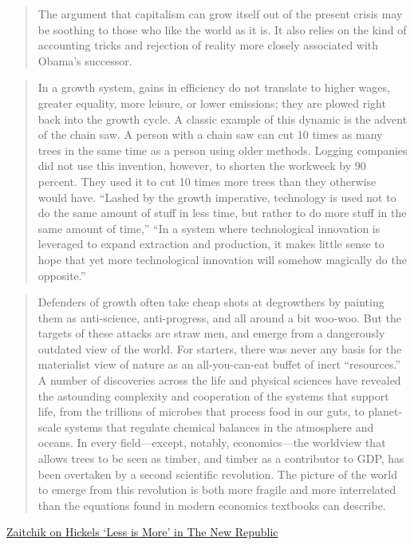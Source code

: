 \documentclass[
]{book}
\begin{document}
\begin{quote}
The argument that capitalism can grow itself out of the present crisis may be soothing to those who like the world as it is. It also relies on the kind of accounting tricks and rejection of reality more closely associated with Obama's successor.
\end{quote}

\begin{quote}
In a growth system, gains in efficiency do not translate to higher wages, greater equality, more leisure, or lower emissions; they are plowed right back into the growth cycle. A classic example of this dynamic is the advent of the chain saw. A person with a chain saw can cut 10 times as many trees in the same time as a person using older methods. Logging companies did not use this invention, however, to shorten the workweek by 90 percent. They used it to cut 10 times more trees than they otherwise would have. ``Lashed by the growth imperative, technology is used not to do the same amount of stuff in less time, but rather to do more stuff in the same amount of time,''
``In a system where technological innovation is leveraged to expand extraction and production, it makes little sense to hope that yet more technological innovation will somehow magically do the opposite.''
\end{quote}

\begin{quote}
Defenders of growth often take cheap shots at degrowthers by painting them as anti-science, anti-progress, and all around a bit woo-woo. But the targets of these attacks are straw men, and emerge from a dangerously outdated view of the world. For starters, there was never any basis for the materialist view of nature as an all-you-can-eat buffet of inert ``resources.'' A number of discoveries across the life and physical sciences have revealed the astounding complexity and cooperation of the systems that support life, from the trillions of microbes that process food in our guts, to planet-scale systems that regulate chemical balances in the atmosphere and oceans. In every field---except, notably, economics---the worldview that allows trees to be seen as timber, and timber as a contributor to GDP, has been overtaken by a second scientific revolution. The picture of the world to emerge from this revolution is both more fragile and more interrelated than the equations found in modern economics textbooks can describe.
\end{quote}

\href{https://newrepublic.com/article/160692/less-is-more-degrowth-climate-change-book-review}{Zaitchik on Hickels `Less is More' in The New Republic}
\end{document}
